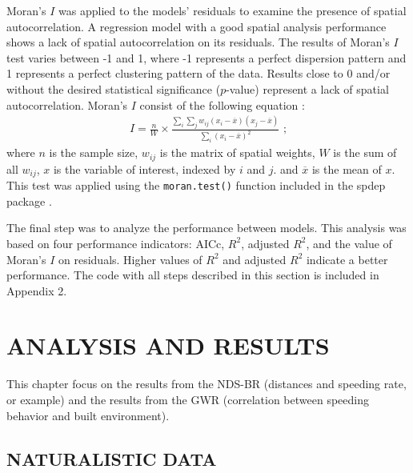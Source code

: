 Moran's $I$ was applied to the models' residuals to examine the presence of spatial autocorrelation. A regression model with a good spatial analysis performance shows a lack of spatial autocorrelation on its residuals. The results of Moran's $I$ test varies between -1 and 1, where -1 represents a perfect dispersion pattern and 1 represents a perfect clustering pattern of the data. Results close to 0 and/or without the desired statistical significance ($p$-value) represent a lack of spatial autocorrelation. Moran's $I$ consist of the following equation \cite{Getis2010}: \begin{align}
    I = \frac{n}{W} \times \frac{\sum_i \sum_j w_{ij} (x_i - \overline{x})(x_j - \overline{x})}{\sum_i (x_i - \overline{x})^2} \mbox{ ;}
\end{align} where $n$ is the sample size, $w_{ij}$ is the matrix of spatial weights, $W$ is the sum of all $w_{ij}$, $x$ is the variable of interest, indexed by $i$ and $j$. and $\overline{x}$ is the mean of $x$. This test was applied using the \verb|moran.test()| function included in the spdep package \cite{Bivand2013}.

The final step was to analyze the performance between models. This analysis was based on four performance indicators: AICc, $R^2$, adjusted $R^2$, and the value of Moran's $I$ on residuals. Higher values of $R^2$ and adjusted $R^2$ indicate a better performance. The code with all steps described in this section is included in Appendix 2.

\chapter{ANALYSIS AND RESULTS} \label{cap:results}


This chapter focus on the results from the NDS-BR (distances and speeding rate, or example) and the results from the GWR (correlation between speeding behavior and built environment). 

\section{NATURALISTIC DATA} \label{sec:ndsr}


